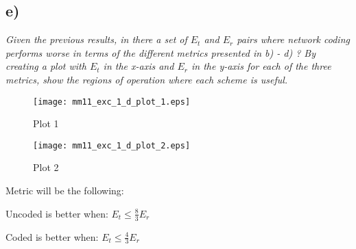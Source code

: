 \FloatBarrier
\subsection{e)} 
\textit{Given the previous results, in there a set of $E_t$ and $E_r$ pairs where network coding performs worse in terms of the different metrics presented in b) - d) ? By creating a plot with $E_t$ in the x-axis and $E_r$ in the y-axis for each of the three metrics, show the regions of operation where each scheme is useful.}

\begin{figure}[h!]
  \centering
  \texttt{[image: mm11\_exc\_1\_d\_plot\_1.eps]}
  \caption{Plot 1}
  \label{fig:mm11_exc_1_d_plot_1}
\end{figure}

\begin{figure}[h!]
  \centering
  \texttt{[image: mm11\_exc\_1\_d\_plot\_2.eps]}
  \caption{Plot 2}
  \label{fig:mm11_exc_1_d_plot_2}
\end{figure}

\FloatBarrier
Metric will be the following:
\begin{pitemize}
	\item Uncoded is better when: $E_t\leq\frac{8}{3}E_r$
	\item Coded is better when: $E_t\leq\frac{4}{3}E_r$
\end{pitemize}


